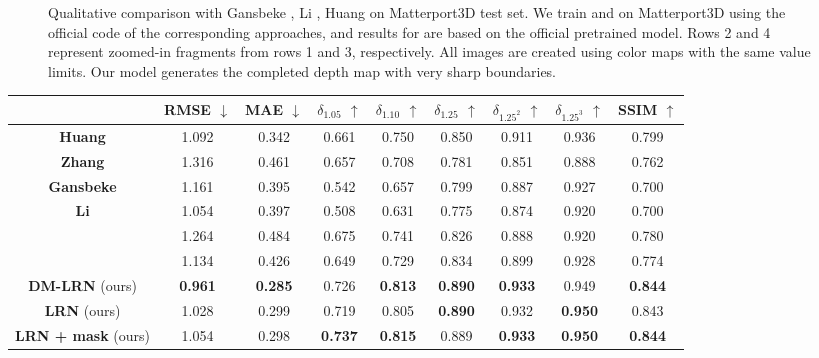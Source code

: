 \documentclass[final]{cvpr}
\begin{document}
\begin{figure*}[h]
    \caption{Qualitative comparison with Gansbeke \etal\cite{wvangansbeke_depth_2019}, Li \etal\cite{msg_chn}, Huang \etal\cite{Huang_2019} on Matterport3D test set. We train \cite{wvangansbeke_depth_2019} and \cite{msg_chn} on Matterport3D using the official code of the corresponding approaches, and results for \cite{Huang_2019} are based on the official pretrained model. Rows 2 and 4 represent zoomed-in fragments from rows 1 and 3, respectively. All images are created using color maps with the same value limits. Our model generates the completed depth map with very sharp boundaries.}
    \label{fig:mp3d_viz_test}
    \end{figure*}
    
    \begin{table*}[!th]
    \setlength{\tabcolsep}{8pt}
    \renewcommand{\arraystretch}{1.0}
    \centering
	\begin{tabular}{|c|c|c|c|c|c|c|c|c|}
	    \hline
	    & RMSE $\downarrow$ & MAE $\downarrow$ & $\delta_{1.05}$ $\uparrow$ & $\delta_{1.10}$ $\uparrow$ & $\delta_{1.25}$ $\uparrow$ & $\delta_{1.25^2}$ $\uparrow$ & $\delta_{1.25^3}$ $\uparrow$ & SSIM $\uparrow$ \\
		\hline
		\hline
		\textbf{Huang} \etal \cite{Huang_2019} & 1.092 & 0.342 & 0.661 & 0.750 & 0.850 & 0.911 & 0.936 & 0.799 \\
		\textbf{Zhang} \etal \cite{DBLP:journals/corr/abs-1803-09326} & 1.316 & 0.461 & 0.657 & 0.708 & 0.781 & 0.851 & 0.888 & 0.762 \\
		\textbf{Gansbeke} \etal \cite{wvangansbeke_depth_2019} & 1.161 & 0.395 & 0.542 & 0.657 & 0.799 & 0.887 & 0.927 & 0.700 \\
		\textbf{Li} \etal \cite{msg_chn} & 1.054 & 0.397 & 0.508 & 0.631 & 0.775 & 0.874 & 0.920 & 0.700 \\
		\makecell{\textbf{Gansbeke} \etal \cite{wvangansbeke_depth_2019} (ours)} & 1.264 & 0.484 & 0.675 & 0.741 & 0.826 & 0.888 & 0.920 & 0.780 \\
		\makecell{\textbf{Li} \etal \cite{msg_chn} (ours)} & 1.134 & 0.426 & 0.649 & 0.729 & 0.834 & 0.899 & 0.928 & 0.774 \\
		\hline
		\textbf{DM-LRN} (ours) & \textbf{0.961} & \textbf{0.285} & 0.726 & \textbf{0.813} & \textbf{0.890} & \textbf{0.933} & 0.949 & \textbf{0.844}\\
		\textbf{LRN} (ours) & 1.028 & 0.299 & 0.719 & 0.805 & \textbf{0.890} & 0.932 & \textbf{0.950} & 0.843 \\
		\textbf{LRN + mask} (ours) & 1.054 & 0.298 & \textbf{0.737} & \textbf{0.815} & 0.889 & \textbf{0.933} & \textbf{0.950} & \textbf{0.844} \\

\end{tabular}
\end{table*}
\end{document}

